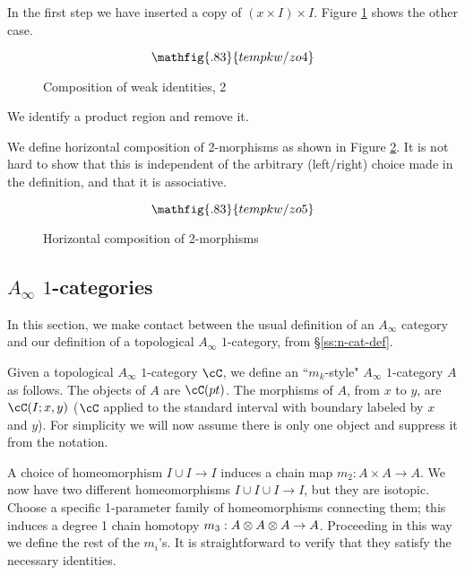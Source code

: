 In the first step we have inserted a copy of $(x\times I)\times I$.
Figure \ref{fzo4} shows the other case.
\begin{figure}[t]
\begin{equation*}
\mathfig{.83}{tempkw/zo4}
\end{equation*}
\caption{Composition of weak identities, 2}
\label{fzo4}
\end{figure}
We identify a product region and remove it.

We define horizontal composition of 2-morphisms as shown in Figure \ref{fzo5}.
It is not hard to show that this is independent of the arbitrary (left/right) 
choice made in the definition, and that it is associative.
\begin{figure}[t]
\begin{equation*}
\mathfig{.83}{tempkw/zo5}
\end{equation*}
\caption{Horizontal composition of 2-morphisms}
\label{fzo5}
\end{figure}



\subsection{$A_\infty$ $1$-categories}
\label{sec:comparing-A-infty}
In this section, we make contact between the usual definition of an $A_\infty$ category 
and our definition of a topological $A_\infty$ $1$-category, from \S \ref{ss:n-cat-def}.

\medskip

Given a topological $A_\infty$ $1$-category $\cC$, we define an ``$m_k$-style" 
$A_\infty$ $1$-category $A$ as follows.
The objects of $A$ are $\cC(pt)$.
The morphisms of $A$, from $x$ to $y$, are $\cC(I; x, y)$
($\cC$ applied to the standard interval with boundary labeled by $x$ and $y$).
For simplicity we will now assume there is only one object and suppress it from the notation.

A choice of homeomorphism $I\cup I \to I$ induces a chain map $m_2: A\times A\to A$.
We now have two different homeomorphisms $I\cup I\cup I \to I$, but they are isotopic.
Choose a specific 1-parameter family of homeomorphisms connecting them; this induces
a degree 1 chain homotopy $m_3:A\otimes A\otimes A\to A$.
Proceeding in this way we define the rest of the $m_i$'s.
It is straightforward to verify that they satisfy the necessary identities.

\medskip

